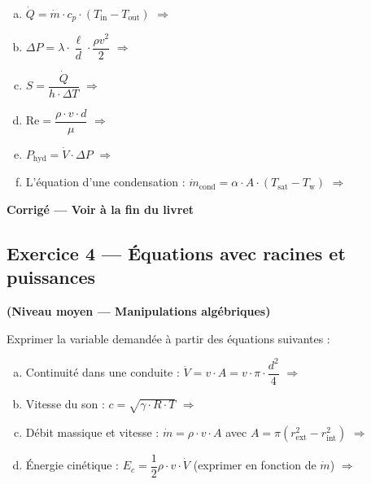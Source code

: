 \begin{enumerate}[a)]
  \item $\dot{Q} = \dot{m} \cdot c_p \cdot (T_{\text{in}} - T_{\text{out}})$ \quad $\Rightarrow$ 

  \item $\Delta P = \lambda \cdot \dfrac{\ell}{d} \cdot \dfrac{\rho v^2}{2}$ \quad $\Rightarrow$ 

  \item $S = \dfrac{\dot{Q}}{h \cdot \Delta T}$ \quad $\Rightarrow$ 

  \item $\text{Re} = \dfrac{\rho \cdot v \cdot d}{\mu}$ \quad $\Rightarrow$ 

  \item $P_{\text{hyd}} = \dot{V} \cdot \Delta P$ \quad $\Rightarrow$ 

  \item L'équation d'une condensation : $\dot{m}_{\text{cond}} = \alpha \cdot A \cdot (T_{\text{sat}} - T_{\text{w}})$ \quad $\Rightarrow$ 
\end{enumerate}

\textbf{Corrigé — Voir à la fin du livret}

\subsection*{Exercice 4 — Équations avec racines et puissances}

\textbf{(Niveau moyen — Manipulations algébriques)}

Exprimer la variable demandée à partir des équations suivantes :

\begin{enumerate}[a)]
  \item Continuité dans une conduite : $\dot{V} = v \cdot A = v \cdot \pi \cdot \dfrac{d^2}{4}$ \quad $\Rightarrow$ 

  \item Vitesse du son : $c = \sqrt{\gamma \cdot R \cdot T}$ \quad $\Rightarrow$ 

  \item Débit massique et vitesse : $\dot{m} = \rho \cdot v \cdot A$ avec $A = \pi (r_{\text{ext}}^2 - r_{\text{int}}^2)$ \quad 
        $\Rightarrow$ 

  \item Énergie cinétique : $E_c = \dfrac{1}{2} \rho \cdot v \cdot \dot{V}$ (exprimer en fonction de $\dot{m}$) \quad $\Rightarrow$ 
\end{enumerate}


